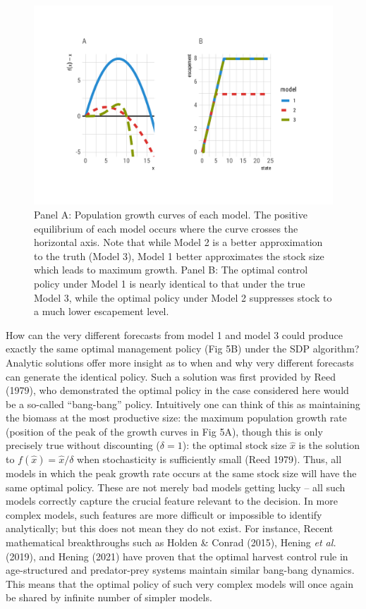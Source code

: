 \documentclass[3p]{elsarticle} %
\begin{document}
\begin{figure}
\centering
\includegraphics{manuscript_files/figure-latex/figure5-1.pdf}
\caption{Panel A: Population growth curves of each model. The positive
equilibrium of each model occurs where the curve crosses the horizontal
axis. Note that while Model 2 is a better approximation to the truth
(Model 3), Model 1 better approximates the stock size which leads to
maximum growth. Panel B: The optimal control policy under Model 1 is
nearly identical to that under the true Model 3, while the optimal
policy under Model 2 suppresses stock to a much lower escapement level.}
\end{figure}

How can the very different forecasts from model 1 and model 3 could
produce exactly the same optimal management policy (Fig 5B) under the
SDP algorithm? Analytic solutions offer more insight as to when and why
very different forecasts can generate the identical policy. Such a
solution was first provided by Reed (1979), who demonstrated the optimal
policy in the case considered here would be a so-called ``bang-bang''
policy. Intuitively one can think of this as maintaining the biomass at
the most productive size: the maximum population growth rate (position
of the peak of the growth curves in Fig 5A), though this is only
precisely true without discounting (\(\delta = 1\)): the optimal stock
size \(\hat x\) is the solution to \(f(\hat x) = \hat x/\delta\) when
stochasticity is sufficiently small (Reed 1979). Thus, all models in
which the peak growth rate occurs at the same stock size will have the
same optimal policy. These are not merely bad models getting lucky --
all such models correctly capture the crucial feature relevant to the
decision. In more complex models, such features are more difficult or
impossible to identify analytically; but this does not mean they do not
exist. For instance, Recent mathematical breakthroughs such as Holden \&
Conrad (2015), Hening \emph{et al.} (2019), and Hening (2021) have
proven that the optimal harvest control rule in age-structured and
predator-prey systems maintain similar bang-bang dynamics. This means
that the optimal policy of such very complex models will once again be
shared by infinite number of simpler models.
\end{document}
